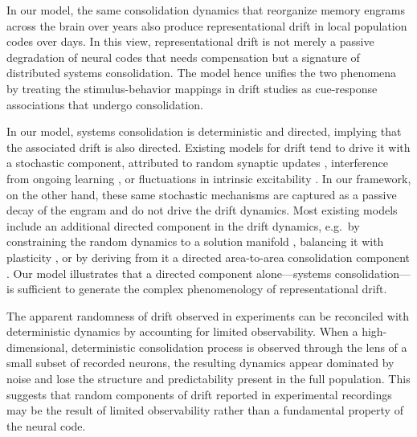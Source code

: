 In our model, the same consolidation dynamics that reorganize memory engrams across the brain over years also produce representational drift in local population codes over days. In this view, representational drift is not merely a passive degradation of neural codes that needs compensation \citep{Rule2020,KalleKossio2021} but a signature of distributed systems consolidation. The model hence unifies the two phenomena by treating the stimulus-behavior mappings in drift studies as cue-response associations that undergo consolidation.

In our model, systems consolidation is deterministic and directed, implying that the associated drift is also directed. Existing models for drift tend to drive it with a stochastic component, attributed to random synaptic updates \citep{Qin2023,Ratzon2024,Morales2024,Eppler2026}, interference from ongoing learning \citep{Devalle2025}, or fluctuations in intrinsic excitability \citep{Delamare2024,Haimerl2025}. In our framework, on the other hand, these same stochastic mechanisms are captured as a passive decay of the engram and do not drive the drift dynamics. Most existing models include an additional directed component in the drift dynamics, e.g.~by constraining the random dynamics to a solution manifold \citep{Ratzon2024,Natrajan2024}, balancing it with plasticity \citep{Qin2023,Devalle2025,Morales2024,Eppler2026}, or by deriving from it a directed area-to-area consolidation component \citep{Kossio2025}. Our model illustrates that a directed component alone---systems consolidation---is sufficient to generate the complex phenomenology of representational drift.

The apparent randomness of drift observed in experiments can be reconciled with deterministic dynamics by accounting for limited observability. When a high-dimensional, deterministic consolidation process is observed through the lens of a small subset of recorded neurons, the resulting dynamics appear dominated by noise and lose the structure and predictability present in the full population. This %
suggests that random components of drift reported in experimental recordings \citep{Rule2020,Schoonover2021} may be the result of limited observability rather than a fundamental property of the neural code.

